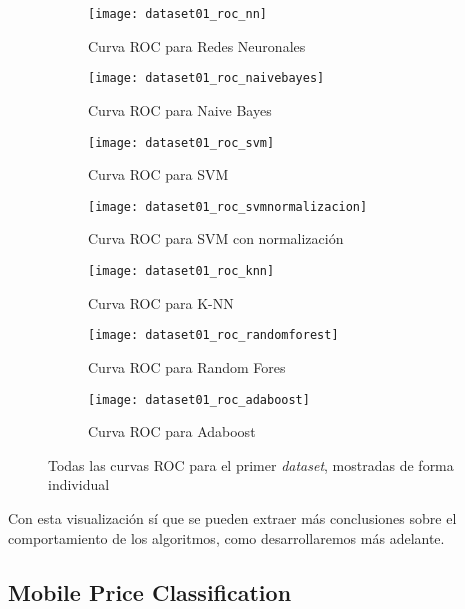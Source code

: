 \documentclass[11pt]{article}
\begin{document}
\begin{figure}[H]
    \centering

    \begin{subfigure}[b]{0.4 \textwidth}
        \texttt{[image: dataset01\_roc\_nn]}
        \caption{Curva ROC para Redes Neuronales}
    \end{subfigure}
    \begin{subfigure}[b]{0.4 \textwidth}
        \texttt{[image: dataset01\_roc\_naivebayes]}
        \caption{Curva ROC para Naive Bayes}
    \end{subfigure}

    \begin{subfigure}[b]{0.4 \textwidth}
        \texttt{[image: dataset01\_roc\_svm]}
        \caption{Curva ROC para SVM}
    \end{subfigure}
    \begin{subfigure}[b]{0.4 \textwidth}
        \texttt{[image: dataset01\_roc\_svmnormalizacion]}
        \caption{Curva ROC para SVM con normalización}
    \end{subfigure}

    \begin{subfigure}[b]{0.4 \textwidth}
        \texttt{[image: dataset01\_roc\_knn]}
        \caption{Curva ROC para K-NN}
    \end{subfigure}
    \begin{subfigure}[b]{0.4 \textwidth}
        \texttt{[image: dataset01\_roc\_randomforest]}
        \caption{Curva ROC para Random Fores}
    \end{subfigure}

    \begin{subfigure}[b]{0.4 \textwidth}
        \texttt{[image: dataset01\_roc\_adaboost]}
        \caption{Curva ROC para Adaboost}
    \end{subfigure}

    \caption{Todas las curvas ROC para el primer \emph{dataset}, mostradas de forma individual}
\end{figure}

Con esta visualización sí que se pueden extraer más conclusiones sobre el comportamiento de los algoritmos, como desarrollaremos más adelante.

\pagebreak

\subsection{Mobile Price Classification} \label{mobile_price_cross_validation:seccion}
\end{document}
